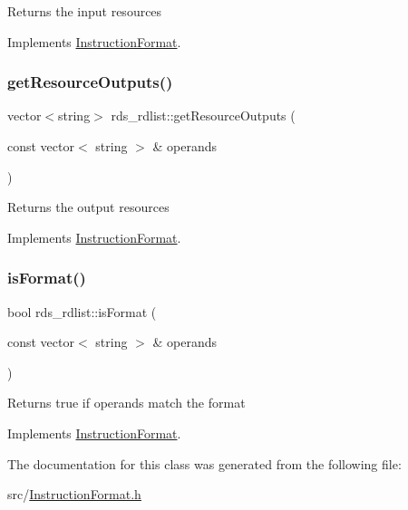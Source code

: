 Returns the input resources 

Implements \hyperlink{classInstructionFormat_a09775d3a3c22f40a0f44504664e586e4}{Instruction\+Format}.

\mbox{\label{classrds__rdlist_a42eb3f3d04fec1d67da0b7de1d27ac10}} 
\subsubsection{\texorpdfstring{get\+Resource\+Outputs()}{getResourceOutputs()}}
{\footnotesize\ttfamily vector$<$string$>$ rds\+\_\+rdlist\+::get\+Resource\+Outputs (\begin{DoxyParamCaption}\item[{const vector$<$ string $>$ \&}]{operands }\end{DoxyParamCaption})\hspace{0.3cm}{\ttfamily [virtual]}}

Returns the output resources 

Implements \hyperlink{classInstructionFormat_a95cd28ffb1bde59b67f676880ab10536}{Instruction\+Format}.

\mbox{\label{classrds__rdlist_ad3df9613000e862de6ee574509e1bf0c}} 
\subsubsection{\texorpdfstring{is\+Format()}{isFormat()}}
{\footnotesize\ttfamily bool rds\+\_\+rdlist\+::is\+Format (\begin{DoxyParamCaption}\item[{const vector$<$ string $>$ \&}]{operands }\end{DoxyParamCaption})\hspace{0.3cm}{\ttfamily [virtual]}}

Returns true if operands match the format 

Implements \hyperlink{classInstructionFormat_a9fdcf94dcd7d9a55ba86e7a63f04d1fe}{Instruction\+Format}.



The documentation for this class was generated from the following file\+:\begin{DoxyCompactItemize}
\item 
src/\hyperlink{InstructionFormat_8h}{Instruction\+Format.\+h}\end{DoxyCompactItemize}
